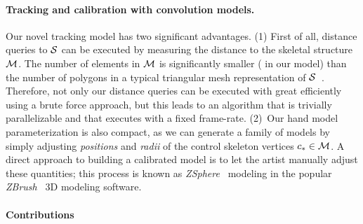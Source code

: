 \paragraph{Tracking and calibration with convolution models.}
Our novel tracking model has two significant advantages. (1) First of all, distance queries to $\mathcal{S}$ can be executed by measuring the distance to the skeletal structure $\mathcal{M}$. The number of elements in $\mathcal{M}$ is significantly smaller ( in our model) than the number of polygons in a typical triangular mesh representation of $\mathcal{S}$~\cite{thiery2013sphere}. Therefore, not only our distance queries can be executed with great efficiently using a brute force approach, but this leads to an algorithm that is trivially parallelizable and that executes with a fixed frame-rate. (2)~Our hand model parameterization is also compact, as we can generate a family of models by simply adjusting \emph{positions} and \emph{radii} of the control skeleton vertices $c_* \in \mathcal{M}$. A direct approach to building a calibrated model is to let the artist manually adjust these quantities; this process is known as  \emph{ZSphere~{\textcopyright}} modeling in the popular \emph{ZBrush~\textcopyright} 3D modeling software.  


\paragraph{Contributions }
